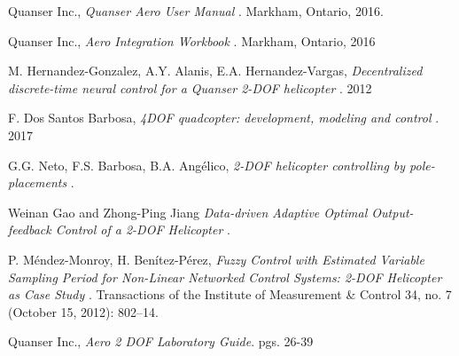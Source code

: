 \documentclass[fontsize=11pt, %
                             paper=letter, %
                             openany, %
                             captions=tableheading,
                             index=totoc,
                             hyperref]{labbook}
\begin{document}






\begin{thebibliography}{9}

Quanser Inc.,
\emph{Quanser Aero User Manual }.
Markham, Ontario,
2016.

Quanser Inc.,
\emph{Aero Integration Workbook }.
Markham, Ontario,
2016

M. Hernandez-Gonzalez, A.Y. Alanis, E.A. Hernandez-Vargas,
\emph{Decentralized discrete-time neural control for a Quanser 2-DOF helicopter }.
2012

F. Dos Santos Barbosa,
\emph{4DOF quadcopter: development, modeling and control }.
2017

G.G. Neto, F.S. Barbosa, B.A. Ang\'{e}lico,
\emph{2-DOF helicopter controlling by pole-placements }.

Weinan Gao and Zhong-Ping Jiang
\emph{Data-driven Adaptive Optimal Output-feedback Control of a 2-DOF Helicopter }.

P. Méndez-Monroy, H. Benítez-Pérez,
\emph{Fuzzy Control with Estimated Variable Sampling Period for Non-Linear Networked Control Systems: 2-DOF Helicopter as Case Study }. 
Transactions of the Institute of Measurement \& Control 34, no. 7 (October 15, 2012): 802–14. 

Quanser Inc.,
\emph{Aero 2 DOF Laboratory Guide}.
pgs. 26-39 %


\end{thebibliography}

\end{document}
